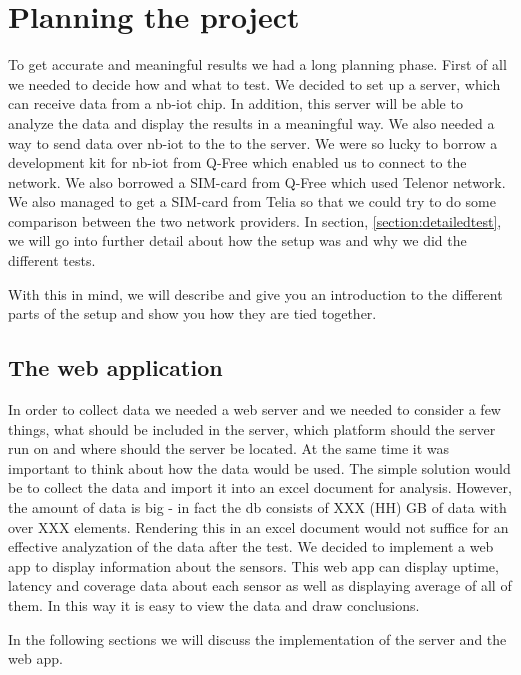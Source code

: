 \documentclass[USenglish]{ifimaster}  %
\begin{document}
\chapter{Planning the project}        %
To get accurate and meaningful results we had a long planning phase. First of all we needed to decide how and what to test. We decided to set up a server, which can receive data from a \acrshort{nb-iot} chip. In addition, this server will be able to analyze the data and display the results in a meaningful way. We also needed a way to send data over \acrshort{nb-iot} to the to the server. We were so lucky to borrow a development kit for \acrshort{nb-iot} from Q-Free which enabled us to connect to the network. We also borrowed a SIM-card from Q-Free which used Telenor network. We also managed to get a SIM-card from Telia so that we could try to do some comparison between the two network providers. In section, \vref{section:detailedtest}, we will go into further detail about how the setup was and why we did the different tests.

With this in mind, we will describe and give you an introduction to the different parts of the setup and show you how they are tied together.

\section{The web application}
In order to collect data we needed a web server and we needed to consider a few things, what should be included in the server, which platform should the server run on and where should the server be located. At the same time it was important to think about how the data would be used. The simple solution would be to collect the data and import it into an excel document for analysis. However, the amount of data is big - in fact the db consists of XXX (HH) GB of data with over XXX elements. Rendering this in an excel document would not suffice for an effective analyzation of the data after the test. We decided to implement a web app to display information about the sensors. This web app can display uptime, latency and coverage data about each sensor as well as displaying average of all of them. In this way it is easy to view the data and draw conclusions.

In the following sections we will discuss the implementation of the server and the web app.
\end{document}
